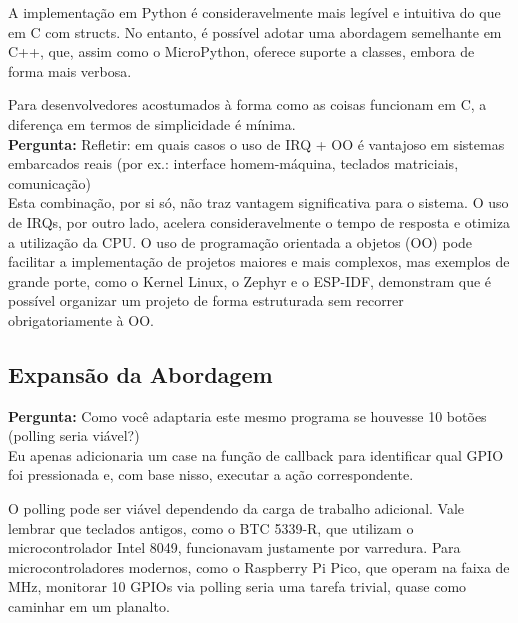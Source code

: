 \documentclass{article}
\begin{document}
\noindent
A implementação em Python é consideravelmente mais legível e intuitiva do que em C com structs. No entanto, é possível adotar uma abordagem semelhante em C++, que, assim como o MicroPython, oferece suporte a classes, embora de forma mais verbosa.

Para desenvolvedores acostumados à forma como as coisas funcionam em C, a diferença em termos de simplicidade é mínima. \\

\noindent
\textbf{Pergunta:} Refletir: em quais casos o uso de IRQ + OO é vantajoso em sistemas embarcados reais (por ex.: interface homem-máquina, teclados matriciais, comunicação) \\

\noindent
Esta combinação, por si só, não traz vantagem significativa para o sistema. O uso de IRQs, por outro lado, acelera consideravelmente o tempo de resposta e otimiza a utilização da CPU. O uso de programação orientada a objetos (OO) pode facilitar a implementação de projetos maiores e mais complexos, mas exemplos de grande porte, como o Kernel Linux, o Zephyr e o ESP-IDF, demonstram que é possível organizar um projeto de forma estruturada sem recorrer obrigatoriamente à OO. \\

\subsection{Expansão da Abordagem}

\noindent
\textbf{Pergunta:} Como você adaptaria este mesmo programa se houvesse 10 botões (polling seria viável?) \\

Eu apenas adicionaria um case na função de callback para identificar qual GPIO foi pressionada e, com base nisso, executar a ação correspondente.

O polling pode ser viável dependendo da carga de trabalho adicional. Vale lembrar que teclados antigos, como o BTC 5339-R, que utilizam o microcontrolador Intel 8049, funcionavam justamente por varredura. Para microcontroladores modernos, como o Raspberry Pi Pico, que operam na faixa de MHz, monitorar 10 GPIOs via polling seria uma tarefa trivial, quase como caminhar em um planalto.
\end{document}
